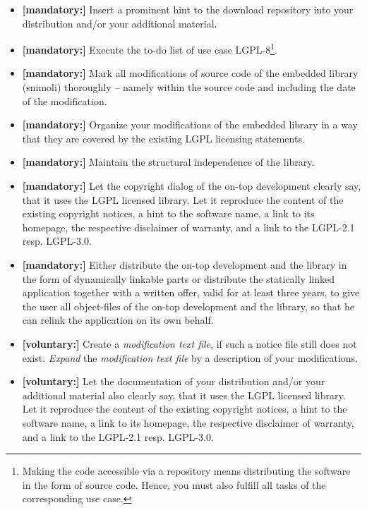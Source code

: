 \begin{description}
\begin{itemize}
  \item \textbf{[mandatory:]} Insert a prominent hint to the download repository
  into your distribution and/or your additional material.
    
  \item \textbf{[mandatory:]} Execute the to-do list of use case LGPL-8\footnote{
  Making the code accessible via a repository means distributing the software in
  the form of source code. Hence, you must also fulfill all tasks of the
  corresponding use case.}.

  \item \textbf{[mandatory:]} Mark all modifications of source code of the
  embedded library (snimoli) thoroughly -- namely within the source code and
  including the date of the modification.
  
  \item \textbf{[mandatory:]} Organize your modifications of the embedded
  library in a way that they are covered by the existing LGPL licensing
  statements. 

  \item \textbf{[mandatory:]}  Maintain the structural independence of the
  library.
    
  \item \textbf{[mandatory:]} Let the copyright dialog of the on-top development
  clearly say, that it uses the LGPL licensed library. Let it reproduce the
  content of the existing copyright notices, a hint to the software name, a link
  to its homepage, the respective disclaimer of warranty, and a link to the
  LGPL-2.1 resp. LGPL-3.0.
  
  \item \textbf{[mandatory:]} Either distribute the on-top development and the
  library in the form of dynamically linkable parts or distribute the statically
  linked application together with a written offer, valid for at least three
  years, to give the user all object-files of the on-top development and the
  library, so that he can relink the application on its own behalf.
     
  \item \textbf{[voluntary:]} Create a \emph{modification text file}, if such a
  notice file still does not exist. \emph{Expand} the \emph{modification text
  file} by a description of your modifications. 
  
  \item \textbf{[voluntary:]} Let the documentation of your distribution and/or
  your additional material also clearly say, that it uses the LGPL licensed
  library. Let it reproduce the content of the existing copyright notices, a
  hint to the software name, a link to its homepage, the respective disclaimer
  of warranty, and a link to the LGPL-2.1 resp. LGPL-3.0.


\end{itemize}
\end{description}
